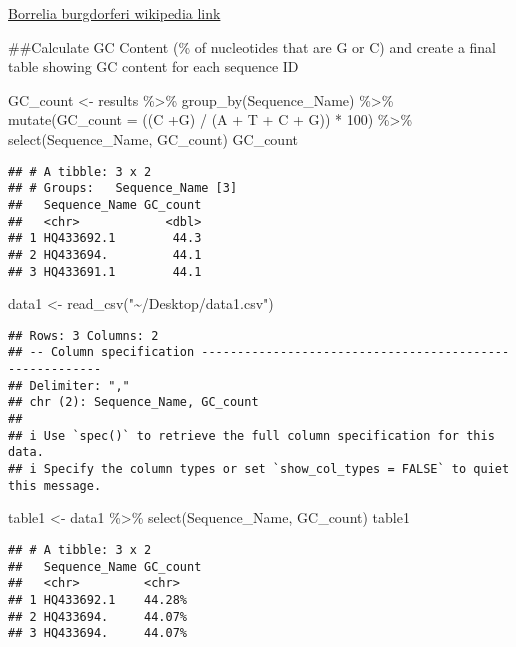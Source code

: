\documentclass[
]{article}
\newenvironment{Shaded}{\begin{snugshade}}{\end{snugshade}}
\newcommand{\AttributeTok}[1]{\textcolor[rgb]{0.77,0.63,0.00}{#1}}
\newcommand{\DecValTok}[1]{\textcolor[rgb]{0.00,0.00,0.81}{#1}}
\newcommand{\FunctionTok}[1]{\textcolor[rgb]{0.00,0.00,0.00}{#1}}
\newcommand{\NormalTok}[1]{#1}
\newcommand{\OtherTok}[1]{\textcolor[rgb]{0.56,0.35,0.01}{#1}}
\newcommand{\SpecialCharTok}[1]{\textcolor[rgb]{0.00,0.00,0.00}{#1}}
\newcommand{\StringTok}[1]{\textcolor[rgb]{0.31,0.60,0.02}{#1}}
\begin{document}
\href{https://en.wikipedia.org/wiki/Borrelia_burgdorferi}{Borrelia
burgdorferi wikipedia link}

\#\#Calculate GC Content (\% of nucleotides that are G or C) and create
a final table showing GC content for each sequence ID

\begin{Shaded}
\begin{Highlighting}[]
\NormalTok{GC\_count }\OtherTok{\textless{}{-}}\NormalTok{ results }\SpecialCharTok{\%\textgreater{}\%}
  \FunctionTok{group\_by}\NormalTok{(Sequence\_Name) }\SpecialCharTok{\%\textgreater{}\%}
  \FunctionTok{mutate}\NormalTok{(}\AttributeTok{GC\_count =}\NormalTok{ ((C }\SpecialCharTok{+}\NormalTok{G) }\SpecialCharTok{/}\NormalTok{ (A }\SpecialCharTok{+}\NormalTok{ T }\SpecialCharTok{+}\NormalTok{ C }\SpecialCharTok{+}\NormalTok{ G)) }\SpecialCharTok{*} \DecValTok{100}\NormalTok{) }\SpecialCharTok{\%\textgreater{}\%}
  \FunctionTok{select}\NormalTok{(Sequence\_Name, GC\_count)}
\NormalTok{GC\_count}
\end{Highlighting}
\end{Shaded}

\begin{verbatim}
## # A tibble: 3 x 2
## # Groups:   Sequence_Name [3]
##   Sequence_Name GC_count
##   <chr>            <dbl>
## 1 HQ433692.1        44.3
## 2 HQ433694.         44.1
## 3 HQ433691.1        44.1
\end{verbatim}

\begin{Shaded}
\begin{Highlighting}[]
\NormalTok{data1 }\OtherTok{\textless{}{-}} \FunctionTok{read\_csv}\NormalTok{(}\StringTok{"\textasciitilde{}/Desktop/data1.csv"}\NormalTok{)}
\end{Highlighting}
\end{Shaded}

\begin{verbatim}
## Rows: 3 Columns: 2
## -- Column specification --------------------------------------------------------
## Delimiter: ","
## chr (2): Sequence_Name, GC_count
## 
## i Use `spec()` to retrieve the full column specification for this data.
## i Specify the column types or set `show_col_types = FALSE` to quiet this message.
\end{verbatim}

\begin{Shaded}
\begin{Highlighting}[]
\NormalTok{table1 }\OtherTok{\textless{}{-}}\NormalTok{ data1 }\SpecialCharTok{\%\textgreater{}\%}
  \FunctionTok{select}\NormalTok{(Sequence\_Name, GC\_count)}
\NormalTok{table1}
\end{Highlighting}
\end{Shaded}

\begin{verbatim}
## # A tibble: 3 x 2
##   Sequence_Name GC_count
##   <chr>         <chr>   
## 1 HQ433692.1    44.28%  
## 2 HQ433694.     44.07%  
## 3 HQ433694.     44.07%
\end{verbatim}
\end{document}
